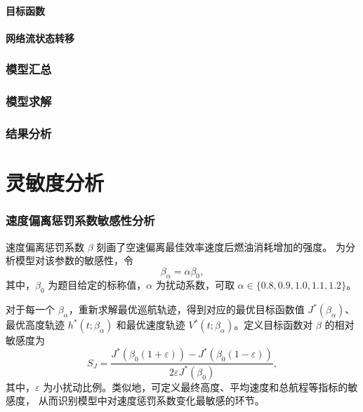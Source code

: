 \documentclass[UTF8]{ctexart}
\begin{document}
\paragraph{目标函数}
\paragraph{网络流状态转移}
\subsubsection{模型汇总}
\subsubsection{模型求解}
\subsubsection{结果分析}
\section{灵敏度分析} 

\subsubsection{速度偏离惩罚系数敏感性分析}

速度偏离惩罚系数 $\beta$ 刻画了空速偏离最佳效率速度后燃油消耗增加的强度。
为分析模型对该参数的敏感性，令
\begin{equation}
    \beta_{\alpha}=\alpha\beta_0,
    \label{eq:q4_beta_alpha}
\end{equation}
其中，$\beta_0$ 为题目给定的标称值，$\alpha$ 为扰动系数，可取
$\alpha\in\{0.8,0.9,1.0,1.1,1.2\}$。

对于每一个 $\beta_{\alpha}$，重新求解最优巡航轨迹，得到对应的最优目标函数值
$J^*(\beta_{\alpha})$、最优高度轨迹 $h^*(t;\beta_{\alpha})$ 和最优速度轨迹
$V^*(t;\beta_{\alpha})$。定义目标函数对 $\beta$ 的相对敏感度为
\begin{equation}
    S_J
    =
    \frac{
    J^*(\beta_0(1+\varepsilon))-J^*(\beta_0(1-\varepsilon))
    }{
    2\varepsilon J^*(\beta_0)
    },
    \label{eq:q4_sensitivity_J}
\end{equation}
其中，$\varepsilon$ 为小扰动比例。类似地，可定义最终高度、平均速度和总航程等指标的敏感度，
从而识别模型中对速度惩罚系数变化最敏感的环节。
\end{document}
